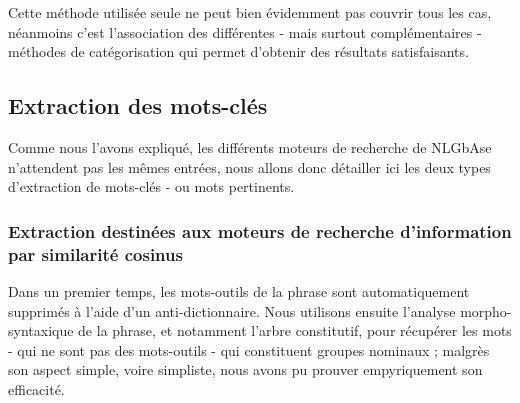 \documentclass[10pt,a4paper]{article}
\begin{document}
\par Cette méthode utilisée seule ne peut bien évidemment pas couvrir tous les cas, néanmoins c'est l'association des différentes - mais surtout complémentaires - méthodes de catégorisation qui permet d'obtenir des résultats satisfaisants.


\subsection{Extraction des mots-clés}

\par Comme nous l'avons expliqué, les différents moteurs de recherche de NLGbAse n'attendent pas les mêmes entrées, nous allons donc détailler ici les deux types d'extraction de mots-clés - ou mots pertinents.

\subsubsection{Extraction destinées aux moteurs de recherche d'information par similarité cosinus}
\par Dans un premier temps, les mots-outils de la phrase sont automatiquement supprimés à l'aide d'un anti-dictionnaire. Nous utilisons ensuite l'analyse morpho-syntaxique de la phrase, et notamment l'arbre constitutif, pour récupérer les mots - qui ne sont pas des mots-outils - qui constituent groupes nominaux ; malgrès son aspect simple, voire simpliste, nous avons pu prouver empyriquement son efficacité.
\end{document}

